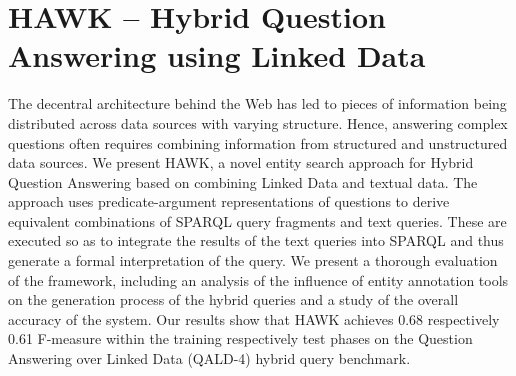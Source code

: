 %

\chapter{HAWK -- Hybrid Question Answering using Linked Data}



The decentral architecture behind the Web has led to pieces of information being distributed across data sources with varying structure. Hence, answering complex questions often requires combining information from structured and unstructured data sources.   
We present HAWK, a novel entity search approach for Hybrid Question Answering based on combining Linked Data and textual data.
The approach uses predicate-argument representations of questions to derive equivalent combinations of SPARQL query fragments and text queries. These are executed so as to integrate the results of the text queries into SPARQL and thus generate a formal interpretation of the query.
%
We present a thorough evaluation of the framework, including an analysis of the influence of entity annotation tools on the generation process of the hybrid queries and a study of the overall accuracy of the system. 
Our results show that HAWK achieves 0.68 respectively 0.61 F-measure within the training respectively test phases on the Question Answering over Linked Data (QALD-4) hybrid query benchmark. %


